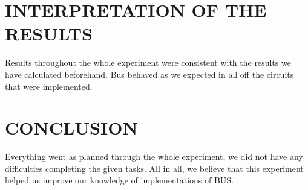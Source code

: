 \documentclass[pdftex,12pt,a4paper]{article}
\begin{document}
\newpage


\section{INTERPRETATION OF THE RESULTS}
Results throughout the whole experiment were consistent with the results we have calculated beforehand. Bus behaved as we expected in all off the circuits that were implemented.
\section{CONCLUSION}
Everything went as planned through the whole experiment, we did not have any difficulties completing the given tasks. All in all, we believe that this experiment helped us improve our knowledge of implementations of BUS.

\nocite{overleaf}
\nocite{reportGuide}

\newpage
{}



\end{document}
